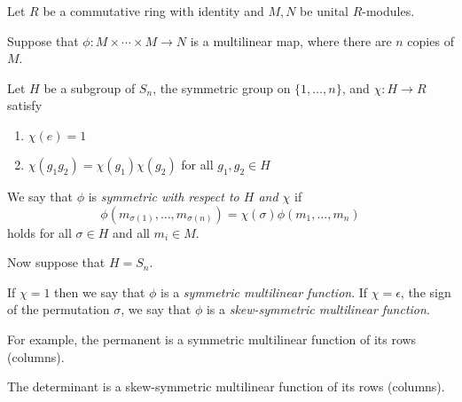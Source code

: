 \documentclass[12pt]{article}
\begin{document}
Let $R$ be a commutative ring with identity and $M,N$ be unital $R$-modules.

Suppose that $\phi : M \times \cdots \times M \to N$ is a multilinear map, where there
are $n$ copies of $M$. 

Let $H$ be a subgroup of $S_n$, the symmetric group on $\{1, \ldots ,n\}$, and
$\chi : H \to R$ satisfy 
\begin{enumerate}
\item
$\chi(e) = 1$ 
\item
$\chi(g_1g_2) = \chi(g_1)\chi(g_2)$ for all $g_1, g_2 \in H $
\end{enumerate}
We say that $\phi$ is \emph{symmetric with respect to $H$ and $\chi$}
if 
$$ \phi(m_{\sigma(1)} , \ldots, m_{\sigma(n)}) = \chi(\sigma)\phi(m_1,\ldots,m_n)$$
holds for all $\sigma\in H$ and all $m_i\in M$. 

Now suppose that $H = S_n$.

If $\chi=1$ then we say that $\phi$ is a \emph{symmetric multilinear function}.
If $\chi = \epsilon$, the sign of the permutation $\sigma$, we say that 
$\phi$ is a \emph{skew-symmetric multilinear function}.

For example, the permanent is a symmetric multilinear function of its rows (columns).

The determinant is a skew-symmetric multilinear function of its rows (columns).
\end{document}
